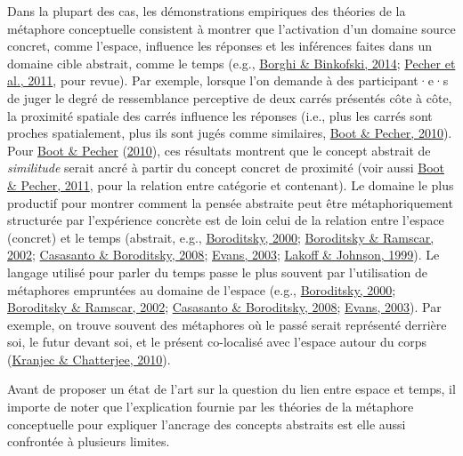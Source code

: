 \documentclass[
  a4paper,12pt,twoside,onecolumn,openright,final,oldfontcommands]{memoir}
\begin{document}
Dans la plupart des cas, les démonstrations empiriques des théories de la métaphore conceptuelle consistent à montrer que l'activation d'un domaine source concret, comme l'espace, influence les réponses et les inférences faites dans un domaine cible abstrait, comme le temps (e.g., \protect\hyperlink{ref-borghi_words_2014}{Borghi \& Binkofski, 2014}; \protect\hyperlink{ref-pecher_abstract_2011}{Pecher et al., 2011}, pour revue). Par exemple, lorsque l'on demande à des participant·e·s de juger le degré de ressemblance perceptive de deux carrés présentés côte à côte, la proximité spatiale des carrés influence les réponses (i.e., plus les carrés sont proches spatialement, plus ils sont jugés comme similaires, \protect\hyperlink{ref-boot_similarity_2010}{Boot \& Pecher, 2010}). Pour \protect\hyperlink{ref-boot_similarity_2010}{Boot \& Pecher} (\protect\hyperlink{ref-boot_similarity_2010}{2010}), ces résultats montrent que le concept abstrait de \emph{similitude} serait ancré à partir du concept concret de proximité (voir aussi \protect\hyperlink{ref-boot_representation_2011}{Boot \& Pecher, 2011}, pour la relation entre catégorie et contenant). Le domaine le plus productif pour montrer comment la pensée abstraite peut être métaphoriquement structurée par l'expérience concrète est de loin celui de la relation entre l'espace (concret) et le temps (abstrait, e.g., \protect\hyperlink{ref-boroditsky_metaphoric_2000}{Boroditsky, 2000}; \protect\hyperlink{ref-boroditsky_roles_2002}{Boroditsky \& Ramscar, 2002}; \protect\hyperlink{ref-casasanto_time_2008}{Casasanto \& Boroditsky, 2008}; \protect\hyperlink{ref-evans_structure_2003}{Evans, 2003}; \protect\hyperlink{ref-lakoff_philosophy_1999}{Lakoff \& Johnson, 1999}). Le langage utilisé pour parler du temps passe le plus souvent par l'utilisation de métaphores empruntées au domaine de l'espace (e.g., \protect\hyperlink{ref-boroditsky_metaphoric_2000}{Boroditsky, 2000}; \protect\hyperlink{ref-boroditsky_roles_2002}{Boroditsky \& Ramscar, 2002}; \protect\hyperlink{ref-casasanto_time_2008}{Casasanto \& Boroditsky, 2008}; \protect\hyperlink{ref-evans_structure_2003}{Evans, 2003}). Par exemple, on trouve souvent des métaphores où le passé serait représenté derrière soi, le futur devant soi, et le présent co-localisé avec l'espace autour du corps (\protect\hyperlink{ref-kranjec_are_2010}{Kranjec \& Chatterjee, 2010}).

Avant de proposer un état de l'art sur la question du lien entre espace et temps, il importe de noter que l'explication fournie par les théories de la métaphore conceptuelle pour expliquer l'ancrage des concepts abstraits est elle aussi confrontée à plusieurs limites.
\end{document}
